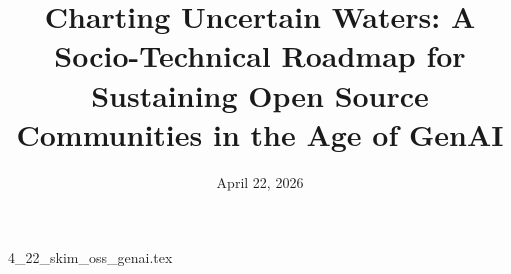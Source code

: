 \documentclass{article}      %
\title{Charting Uncertain Waters: A Socio-Technical Roadmap for Sustaining Open Source Communities in the Age of GenAI}  %
\date{April 22, 2026}
\begin{document}

\maketitle                   %



{4_22_skim_oss_genai.tex}
\printbibliography
\end{document}
